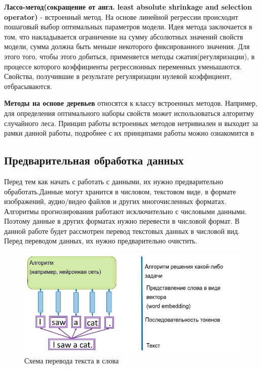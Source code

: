 \textbf{Лассо-метод(сокращение от англ. least absolute shrinkage and selection operator)} - встроенный метод. На основе линейной регрессии происходит пошаговый выбор оптимальных параметров модели.  Идея метода заключается в том, что накладывается ограничение на сумму абсолютных значений свойств модели, сумма должна быть меньше некоторого фиксированного значения. Для этого того, чтобы этого добиться, применяется методы сжатия(регуляризации), в процессе которого коэффициенты регрессионных переменных уменьшаются. Свойства, получившие в результате регуляризации нулевой коэффициент, отбрасываются.

\textbf{Методы на основе деревьев} относятся к классу встроенных методов. Например, для определения оптимального наборы свойств может использоваться алгоритму случайного леса. Принцип работы встроенных методов нетривиален и выходит за рамки данной работы, подробнее с их принципами работы можно ознакомится в \cite{Book15}
\subsection{Предварительная обработка данных}

Перед тем как начать с работать с данными, их нужно предварительно обработать.Данные могут хранится в числовом, текстовом виде, в формате изображений, аудио/видео файлов и других многочисленных форматах. Алгоритмы прогнозирования работают исключительно с числовыми данными. Поэтому данные в других форматах нужно перевести в числовой формат. В данной работе будет рассмотрен перевод текстовых данных в числовой вид. Перед переводом данных, их нужно предварительно очистить.



\begin{figure}[!h]
	\centering
	\includegraphics[width=.5\textwidth]{master_img/learning-word-representations_edited.png}
	\caption{Схема перевода текста в слова}
	\label{fig01_master}
\end{figure}

